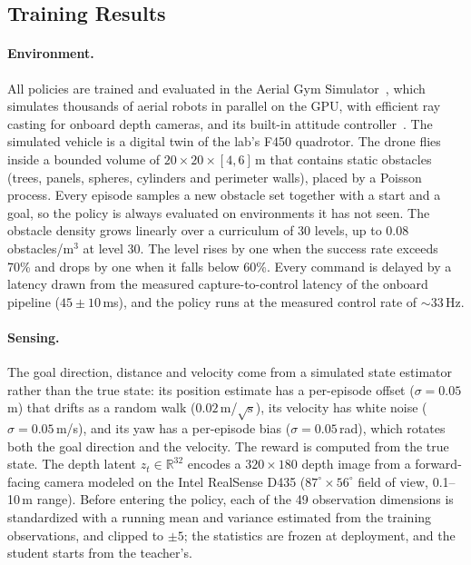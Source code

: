\subsection{Training Results}
\label{subsec:training_results}

\paragraph{Environment.} All policies are trained and evaluated in the Aerial Gym Simulator~\cite{kulkarniAerialGymSimulator2025a}, which simulates thousands of aerial robots in parallel on the GPU, with efficient ray casting for onboard depth cameras, and its built-in attitude controller~\cite{leeControlComplexManeuvers2011}. The simulated vehicle is a digital twin of the lab's F450 quadrotor. The drone flies inside a bounded volume of $20 \times 20 \times [4, 6]$\,m that contains static obstacles (trees, panels, spheres, cylinders and perimeter walls), placed by a Poisson process. Every episode samples a new obstacle set together with a start and a goal, so the policy is always evaluated on environments it has not seen. The obstacle density grows linearly over a curriculum of 30 levels, up to 0.08 obstacles/m$^3$ at level 30. The level rises by one when the success rate exceeds 70\% and drops by one when it falls below 60\%. Every command is delayed by a latency drawn from the measured capture-to-control latency of the onboard pipeline ($45 \pm 10$\,ms), and the policy runs at the measured control rate of $\sim$33\,Hz.

\paragraph{Sensing.} The goal direction, distance and velocity come from a simulated state estimator rather than the true state: its position estimate has a per-episode offset ($\sigma = 0.05$\,m) that drifts as a random walk ($0.02$\,m/$\sqrt{\mathrm{s}}$), its velocity has white noise ($\sigma = 0.05$\,m/s), and its yaw has a per-episode bias ($\sigma = 0.05$\,rad), which rotates both the goal direction and the velocity. The reward is computed from the true state. The depth latent $z_t \in \mathbb{R}^{32}$ encodes a $320 \times 180$ depth image from a forward-facing camera modeled on the Intel RealSense D435 ($87^\circ \times 56^\circ$ field of view, 0.1--10\,m range). Before entering the policy, each of the 49 observation dimensions is standardized with a running mean and variance estimated from the training observations, and clipped to $\pm 5$; the statistics are frozen at deployment, and the student starts from the teacher's.

